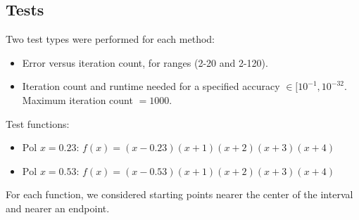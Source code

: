 \subsection{Tests}
Two test types were performed for each method:

\begin{itemize}
    \item Error versus iteration count, for ranges (2-20 and 2-120).
    \item Iteration count and runtime needed for a specified accuracy \(\in [10^{-1}, 10^{-32}\). Maximum iteration count $=1000$.
\end{itemize}

Test functions:\\
\begin{itemize}
    \item \( \text{Pol } x=0.23 \): \( f(x) = (x - 0.23)(x + 1)(x + 2)(x + 3)(x + 4) \)
    \item \( \text{Pol } x=0.53 \): \( f(x) = (x - 0.53)(x + 1)(x + 2)(x + 3)(x + 4) \)
\end{itemize}
For each function, we considered starting points nearer the center of the interval and nearer an endpoint.

